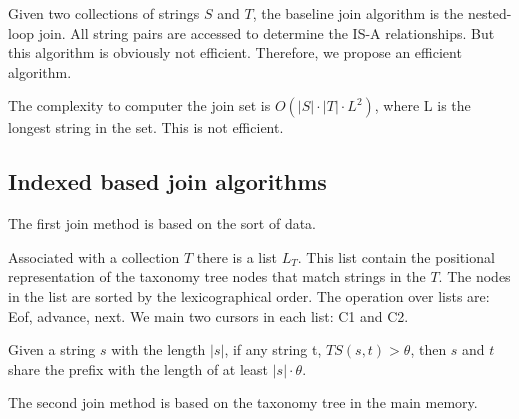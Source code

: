 Given two collections of strings $S$ and $T$, the baseline join algorithm is the nested-loop join. All string pairs are accessed to determine the IS-A relationships. But this algorithm is obviously not efficient. Therefore, we propose an efficient algorithm.

The complexity to computer the join set is $O(|S| \cdot |T| \cdot L^2)$, where L is the longest string in the set. This is not efficient.


\subsection{Indexed based join algorithms}

The first join method is based on the sort of data.

Associated with a collection $T$ there is a list $L_T$. This list contain the positional representation of the taxonomy tree nodes that match strings in the $T$. The nodes in the list are sorted by the lexicographical order. The operation over lists are: Eof, advance, next.
We main two cursors in each list: C1 and C2.

\begin{lem} Given a string $s$ with the length $|s|$, if any string t, $TS(s,t) > \theta$,  then $s$ and $t$ share the prefix with the length of at least $|s| \cdot \theta $.
\end{lem}

The second join method is based on the taxonomy tree in the main memory.




